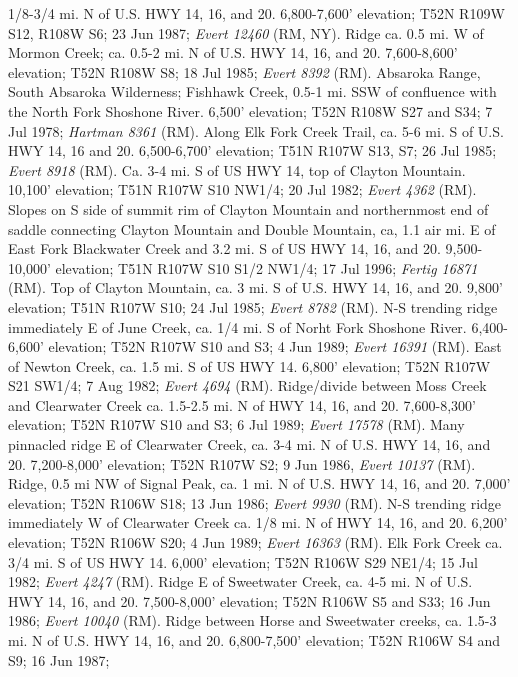 1/8-3/4 mi. N of U.S. HWY 14, 16, and 20. 6,800-7,600' elevation;
T52N R109W S12, R108W S6; 23 Jun 1987; \textit{Evert 12460} (RM, NY).
Ridge ca. 0.5 mi. W of Mormon Creek; ca. 0.5-2 mi. N of U.S. HWY 14, 16, and 20.
7,600-8,600’ elevation; T52N R108W S8; 18 Jul 1985; \textit{Evert 8392} (RM).
Absaroka Range, South Absaroka Wilderness; Fishhawk Creek, 0.5-1 mi. SSW of
confluence with the North Fork Shoshone River. 6,500’ elevation;
T52N R108W S27 and S34; 7 Jul 1978; \textit{Hartman 8361} (RM).
Along Elk Fork Creek Trail, ca. 5-6 mi. S of U.S. HWY 14, 16 and 20.
6,500-6,700' elevation; T51N R107W S13, S7; 26 Jul 1985;
\textit{Evert 8918} (RM).
Ca. 3-4 mi. S of US HWY 14, top of Clayton Mountain. 10,100' elevation;
T51N R107W S10 NW1/4; 20 Jul 1982; \textit{Evert 4362} (RM).
Slopes on S side of summit rim of Clayton Mountain and northernmost end of
saddle connecting Clayton Mountain and Double Mountain, ca, 1.1 air mi. E of
East Fork Blackwater Creek and 3.2 mi. S of US HWY 14, 16, and 20. 9,500-10,000'
elevation; T51N R107W S10 S1/2 NW1/4; 17 Jul 1996; \textit{Fertig 16871} (RM).
Top of Clayton Mountain, ca. 3 mi. S of U.S. HWY 14, 16, and 20. 9,800'
elevation; T51N R107W S10; 24 Jul 1985; \textit{Evert 8782} (RM).
N-S trending ridge immediately E of June Creek, ca. 1/4 mi. S of Norht Fork
Shoshone River. 6,400-6,600’ elevation; T52N R107W S10 and S3; 4 Jun 1989;
\textit{Evert 16391} (RM).
East of Newton Creek, ca. 1.5 mi. S of US HWY 14. 6,800' elevation; T52N R107W
S21 SW1/4; 7 Aug 1982; \textit{Evert 4694} (RM).
Ridge/divide between Moss Creek and Clearwater Creek ca. 1.5-2.5 mi. N of HWY
14, 16, and 20. 7,600-8,300' elevation; T52N R107W S10 and S3; 6 Jul 1989;
\textit{Evert 17578} (RM).
Many pinnacled ridge E of Clearwater Creek, ca. 3-4 mi. N of U.S. HWY 14, 16,
and 20. 7,200-8,000' elevation; T52N R107W S2; 9 Jun 1986,
\textit{Evert 10137} (RM).
Ridge, 0.5 mi NW of Signal Peak, ca. 1 mi. N of U.S. HWY 14, 16, and 20. 7,000'
elevation; T52N R106W S18; 13 Jun 1986; \textit{Evert 9930} (RM).
N-S trending ridge immediately W of Clearwater Creek ca. 1/8 mi. N of HWY 14, 16,
and 20. 6,200' elevation; T52N R106W S20; 4 Jun 1989; \textit{Evert 16363} (RM).
Elk Fork Creek ca. 3/4 mi. S of US HWY 14. 6,000' elevation; T52N R106W S29
NE1/4; 15 Jul 1982; \textit{Evert 4247} (RM).
Ridge E of Sweetwater Creek, ca. 4-5 mi. N of U.S. HWY 14, 16, and 20.
7,500-8,000' elevation; T52N R106W S5 and S33; 16 Jun 1986;
\textit{Evert 10040} (RM).
Ridge between Horse and Sweetwater creeks, ca. 1.5-3 mi. N of U.S. HWY 14, 16,
and 20. 6,800-7,500' elevation; T52N R106W S4 and S9; 16 Jun 1987;
